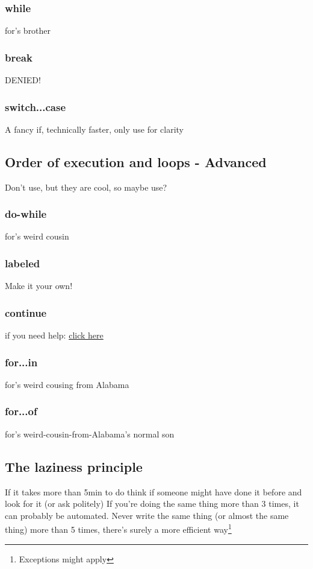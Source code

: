     \subsubsection{while}
    \label{sub:while}
for's brother

    \subsubsection{break}
    \label{subsub:break}
DENIED!

    \subsubsection{switch...case}
    \label{subsub:switch}
A fancy if, technically faster, only use for clarity

\subsection{Order of execution and loops - Advanced}
\label{sub:execAdv}
Don't use, but they are cool, so maybe use?
    \subsubsection{do-while}
    \label{subsub:doWhile}
for's weird cousin

    \subsubsection{labeled}
    \label{subsub:labeled}
Make it your own!

    \subsubsection{continue}
    \label{subsub:continue}
if you need help: \href{http://letmegooglethat.com/?q=continue}{click here}

    \subsubsection{for...in}
    \label{subsub:forIn}
for's weird cousing from Alabama

    \subsubsection{for...of}
    \label{subsub:forOf}
for's weird-cousin-from-Alabama's normal son
    
\subsection{The laziness principle}
\label{sub:lazy}
If it takes more than 5min to do think if someone might have done it before and look for it (or ask politely)
If you're doing the same thing more than 3 times, it can probably be automated. Never write the same thing (or almost the same thing) more than 5 times, there's surely a more efficient way\footnote{Exceptions might apply}
